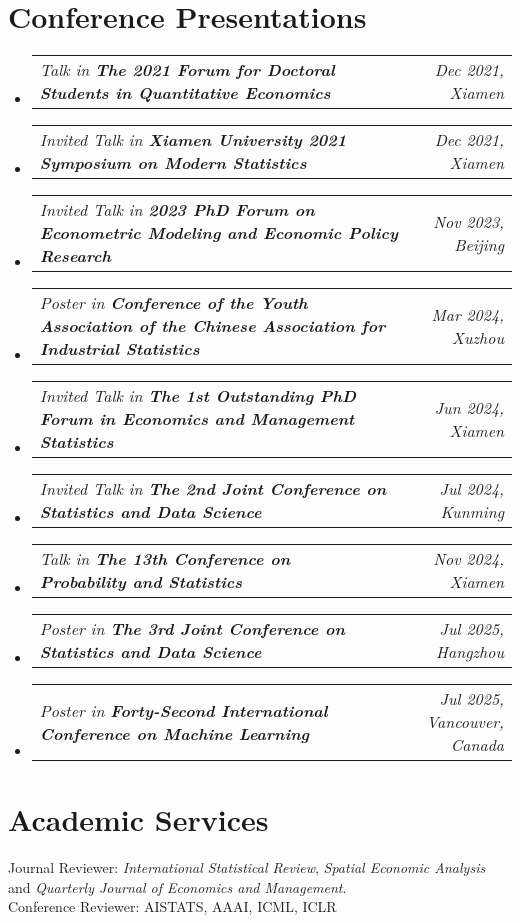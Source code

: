 \documentclass[letterpaper,10pt]{article}
\makeatletter
\newcommand{\resumeSubSubheading}[2]{
    \item
    \begin{tabular*}{0.97\textwidth}{l@{\extracolsep{\fill}}r}
      \textit{\small#1} & \textit{\small #2} \\
    \end{tabular*}\vspace{-7pt}
}
\newcommand{\resumeSubHeadingListStart}{\begin{itemize}[leftmargin=0.15in, label={}]}
\newcommand{\resumeSubHeadingListEnd}{\end{itemize}}
\makeatother
\begin{document}
\section{Conference Presentations}
\resumeSubHeadingListStart
    \resumeSubSubheading
        {Talk in \textbf{The 2021 Forum for Doctoral Students in Quantitative Economics}}{Dec 2021, Xiamen}
    \resumeSubSubheading
        {Invited Talk in \textbf{Xiamen University 2021 Symposium on Modern Statistics}}{Dec 2021, Xiamen}
    \resumeSubSubheading
        {Invited Talk in \textbf{2023 PhD Forum on Econometric Modeling and Economic Policy Research}}{Nov 2023, Beijing}
    \resumeSubSubheading
        {Poster in \textbf{Conference of the Youth Association of the Chinese Association for Industrial Statistics}}{Mar 2024, Xuzhou}
    \resumeSubSubheading
        {Invited Talk in \textbf{The 1st Outstanding PhD Forum in Economics and Management Statistics}}{Jun 2024, Xiamen}
    \resumeSubSubheading
        {Invited Talk in \textbf{The 2nd Joint Conference on Statistics and Data Science}}{Jul 2024, Kunming}
    \resumeSubSubheading
        {Talk in \textbf{The 13th Conference on Probability and Statistics}}{Nov 2024, Xiamen}
    \resumeSubSubheading
        {Poster in \textbf{The 3rd Joint Conference on Statistics and Data Science}}{Jul 2025, Hangzhou}
    \resumeSubSubheading
        {Poster in \textbf{Forty-Second International Conference on Machine Learning}}{Jul 2025, Vancouver, Canada}
\resumeSubHeadingListEnd


  \section{Academic Services}
  Journal Reviewer: \textit{International Statistical Review}, \textit{Spatial Economic Analysis} and \textit{Quarterly Journal of Economics and Management}.\\
 Conference Reviewer: AISTATS, AAAI, ICML, ICLR
\end{document}
